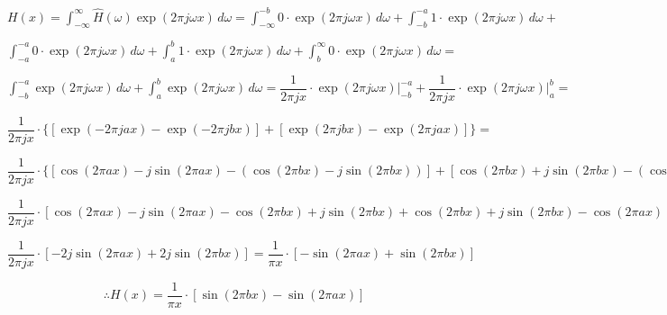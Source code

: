 \documentclass[]{abntex2}
\begin{document}
\begin{center}
$
H(x) = \int_{-\infty}^{\infty} \widehat{H}(\omega) \exp(2 \pi j \omega x) \, d\omega = 
\int_{-\infty}^{-b} 0 \cdot \exp(2 \pi j \omega x) \, d\omega + \int_{-b}^{-a} 1 \cdot \exp(2 \pi j \omega x) \, d\omega + 
$

$
\int_{-a}^{-a} 0 \cdot \exp(2 \pi j \omega x) \, d\omega + \int_{a}^{b} 1 \cdot \exp(2 \pi j \omega x) \, d\omega + \int_{b}^{\infty} 0 \cdot \exp(2 \pi j \omega x) \, d\omega = 
$

$
\int_{-b}^{-a} \exp(2 \pi j \omega x) \, d\omega + \int_{a}^{b} \exp(2 \pi j \omega x) \, d\omega = \dfrac{1}{2\pi jx}\cdot \exp(2\pi j \omega x)\bigg|_{-b}^{-a} + \dfrac{1}{2\pi jx}\cdot \exp(2\pi j \omega x) \bigg|_{a}^{b} = 
$

$
\dfrac{1}{2\pi jx}\cdot \{ [\exp(-2 \pi j a x)- \exp(-2 \pi j b x)] + [\exp(2 \pi j b x)- \exp(2 \pi j a x)]\} =  
$

$
\dfrac{1}{2\pi jx}\cdot \{ [\cos (2\pi a x) -j \sin (2\pi a x) - (\cos (2\pi b x) - j \sin (2\pi b x)) ] + [\cos (2\pi b x) + j \sin (2\pi b x) - (\cos (2\pi a x) + j \sin (2\pi a x))] \}  =
$

$
\dfrac{1}{2\pi jx}\cdot [\cos (2\pi a x) -j \sin (2\pi a x) - \cos (2\pi b x) + j \sin (2\pi b x) + \cos (2\pi b x) + j \sin (2\pi b x) - \cos (2\pi a x) - j \sin (2\pi a x)] = 
$

$
\dfrac{1}{2\pi jx}\cdot [- 2j \sin (2\pi a x) + 2j \sin (2\pi b x)] = \dfrac{1}{\pi x}\cdot [- \sin (2\pi a x) + \sin (2\pi b x)] 
$


\begin{tcolorbox}
\[
	\therefore H(x) = \dfrac{1}{\pi x}\cdot [\sin (2\pi b x) - \sin (2\pi a x)]
\]
\end{tcolorbox}

\end{center}

\end{document}
